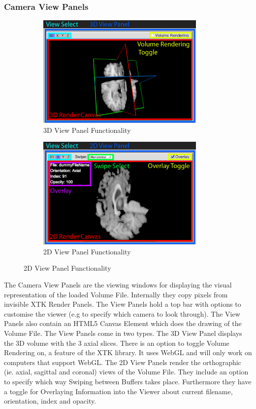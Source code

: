 \documentclass[a4paper,11pt,titlepage]{article}
\begin{document}
\subsubsection{Camera View Panels}

\begin{figure}
\centering
\begin{subfigure}{.5\textwidth}
  \centering
  \includegraphics[width=82mm]{graphics/features_02b.png}
  \caption{3D View Panel Functionality}
  \label{fig:sub1}
\end{subfigure}%
\begin{subfigure}{.5\textwidth}
  \centering
  \includegraphics[width=82mm]{graphics/features_02.png}
  \caption{2D View Panel Functionality}
  \label{fig:sub2}
\end{subfigure}
\end{figure}

The Camera View Panels are the viewing windows for displaying the visual representation of the loaded Volume File. Internally they copy pixels from invisible XTK Render Panels. The View Panels hold a top bar with options to customise the viewer (e.g to specify which camera to look through). The View Panels also contain an HTML5 Canvas Element which does the drawing of the Volume File. The View Panels come in two types. The 3D View Panel displays the 3D volume with the 3 axial slices. There is an option to toggle Volume Rendering on, a feature of the XTK library. It uses WebGL and will only work on computers that support WebGL. The 2D View Panels render the orthographic (ie. axial, sagittal and coronal) views of the Volume File. They include an option to specify which way Swiping between Buffers takes place. Furthermore they have a toggle for Overlaying Information into the Viewer about current filename, orientation, index and opacity.
\end{document}

